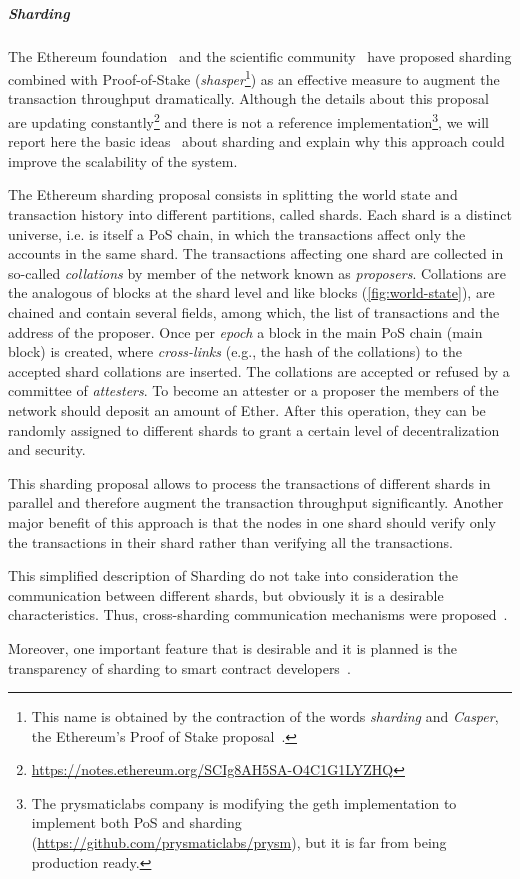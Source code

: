 \subparagraph{Sharding}
The Ethereum foundation~\cite{bib:mauve, bib:sharding-faq} and the scientific
community~\cite{bib:scaling-croman} have proposed sharding combined with
Proof-of-Stake (\emph{shasper}\footnote{This name is obtained by the
contraction of the words \emph{sharding} and \emph{Casper}, the Ethereum's
Proof of Stake proposal~\cite{bib:cbc-casper}.}) as an effective measure to
augment the transaction throughput dramatically.
Although the details about this proposal are updating 
constantly\footnote{\url{https://notes.ethereum.org/SCIg8AH5SA-O4C1G1LYZHQ}}
and there is not a reference implementation\footnote{The prysmaticlabs company 
is modifying the geth implementation to implement both PoS and sharding
(\url{https://github.com/prysmaticlabs/prysm}), but it is far from being
production ready.}, we will report here the basic
ideas~\cite{bib:mauve,bib:sharding-faq} about sharding and explain why this
approach could improve the scalability of the system.

The Ethereum sharding proposal consists in splitting the world state and
transaction history into different partitions, called shards. Each shard is a
distinct universe, i.e. is itself a PoS chain, in which the transactions affect 
only the accounts in the same shard. The transactions affecting one shard are 
collected in so-called \emph{collations} by member of the network known as 
\emph{proposers}. Collations are the analogous of blocks at the shard level and 
like blocks (\autoref{fig:world-state}), are chained and contain several 
fields, among which, the list of transactions and the address of the proposer.
Once per \emph{epoch} a block in the main PoS chain (main block) is created, 
where \emph{cross-links} (e.g., the hash of the collations) to the accepted 
shard collations are inserted. The collations are accepted or refused by a 
committee of \emph{attesters}. To become an attester or a proposer the members 
of the network should deposit an amount of Ether.
After this operation, they can be randomly assigned to different shards to
grant a certain level of decentralization and security.

This sharding proposal allows to process the transactions of different shards
in parallel and therefore augment the transaction throughput significantly.
Another major benefit of this approach is that the nodes in one shard
should verify only the transactions in their shard rather than verifying all the
transactions.

This simplified description of Sharding do not take into consideration the
communication between different shards, but obviously it is a desirable
characteristics. Thus, cross-sharding communication mechanisms were
proposed~\cite{bib:sharding-faq}.

Moreover, one important feature that is desirable and it is planned is the
transparency of sharding to smart contract developers~\cite{bib:sharding-faq}.


